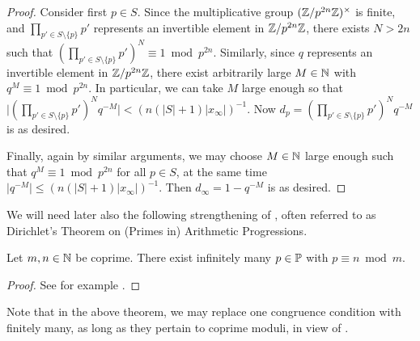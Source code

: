 \documentclass[12pt, leqno, british]{amsart}
\begin{document}
\begin{proof}
Consider first $p \in S$.
Since the multiplicative group $(\mathbb Z/p^{2n}\mathbb Z)^\times$ is finite, and $\prod_{p' \in S \setminus \lbrace p \rbrace} p'$ represents an invertible element in $\mathbb Z/p^{2n}\mathbb Z$, there exists $N > 2n$ such that $(\prod_{p' \in S \setminus \lbrace p \rbrace} p')^N \equiv 1 \bmod p^{2n}$.
Similarly, since $q$ represents an invertible element in $\mathbb Z/p^{2n}\mathbb Z$, there exist arbitrarily large $M \in \mathbb N$ with $q^M \equiv 1 \bmod p^{2n}$.
In particular, we can take $M$ large enough so that $\lvert (\prod_{p' \in S \setminus \lbrace p \rbrace} p')^N q^{-M} \rvert < (n(\lvert S \rvert + 1)\lvert x_\infty \rvert)^{-1}$.
Now $d_p = (\prod_{p' \in S \setminus \lbrace p \rbrace} p')^N q^{-M}$ is as desired.

Finally, again by similar arguments, we may choose $M \in \mathbb N$ large enough such that $q^{M} \equiv 1 \bmod p^{2n}$ for all $p \in S$, at the same time $\lvert q^{-M} \rvert \leq (n(\lvert S \rvert + 1) \lvert x_\infty \rvert)^{-1}$.
Then $d_\infty = 1 - q^{-M}$ is as desired.
\end{proof}
We will need later also the following strengthening of , often referred to as Dirichlet's Theorem on (Primes in) Arithmetic Progressions.
\begin{thm}\label{T:Dirichlet}
Let $m, n \in \mathbb N$ be coprime.
There exist infinitely many $p \in \mathbb P$ with $p \equiv n \bmod m$.
\end{thm}
\begin{proof}
See for example \cite[Section I.10, Exercise 1]{Neu99}.
\end{proof}
Note that in the above theorem, we may replace one congruence condition with finitely many, as long as they pertain to coprime moduli, in view of .
\end{document}

